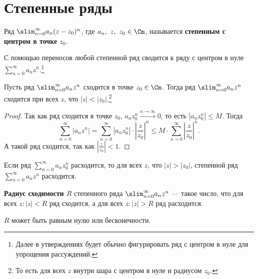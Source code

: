 \section{Степенные ряды}
\begin{defn}
	Ряд $ \slim_{n=0}^{\infty} a_n(z-z_0)^{n}$, где $ a_n, ~ z, ~ z_0 \in \Cm$, называется {\bf степенным с центром в точке $ z_0$}. 
\end{defn}
\begin{note}
	С помощью переносов любой степенной ряд сводится к ряду с центром в нуле $ \sum_{n=0}^{\infty}a_n z^{n} $.\footnote{Далее в утверждениях будет обычно фигурировать ряд с центром в нуле для упрощения рассуждений.}
\end{note}
\begin{thm}
Пусть ряд $ \slim_{n=0}^{\infty} a_n z^{n}$ сходится в точке $ z_0 \in \Cm$. Тогда ряд $ \slim_{n=0}^{\infty} a_n z^{n}$ сходится при всех $ z$, что $ \lvert z \rvert < \lvert z_0 \rvert $.\footnote{То есть для всех $ z$ внутри шара с центром в нуле и радиусом  $ z_0$.}
\end{thm}
\begin{proof}
    Так как ряд сходится в точке $ z_0$, $ a_n z_0^{n} \stackrel{n \to  \infty}{\longrightarrow} 0$, то есть $ \left| a_n z_0^{n} \right| \le M$.
	Тогда
	\[
		\sum_{n=0}^{\infty} \left| a_n z^{n}\right|  = \sum_{n=0}^{\infty} \left| a_n z_0^{n} \right| \cdot \left| \frac{z}{z_0} \right| ^{n} \le M \cdot \sum_{n=0}^{\infty} \left| \frac{z}{z_0} \right| ^{n}
	.\] 
	А такой ряд сходится, так как $ \left| \frac{z}{z_0} \right| < 1$.
\end{proof}
\begin{cor}
    Если ряд $ \sum\limits_{n=0}^{\infty} a_n z^{n}_0 $ расходится, то для всех $ z$, что  $ \lvert z \rvert >\lvert z_0 \rvert $, степенной ряд $ \sum\limits_{n=0}^{\infty} a_n z^{n}$ расходится.
\end{cor}

\begin{defn}
	{\bf Радиус сходимости $ R$} степенного ряда $ \slim_{n=0}^{\infty} a_n z^{n}$ --- такое число, что для всех $ z\colon \lvert z \rvert <R$ ряд сходится, а для всех $ z\colon \lvert z \rvert >R$ ряд расходится.
\end{defn}
\begin{note}
    $ R$ может быть равным нулю или бесконечности.
\end{note}

